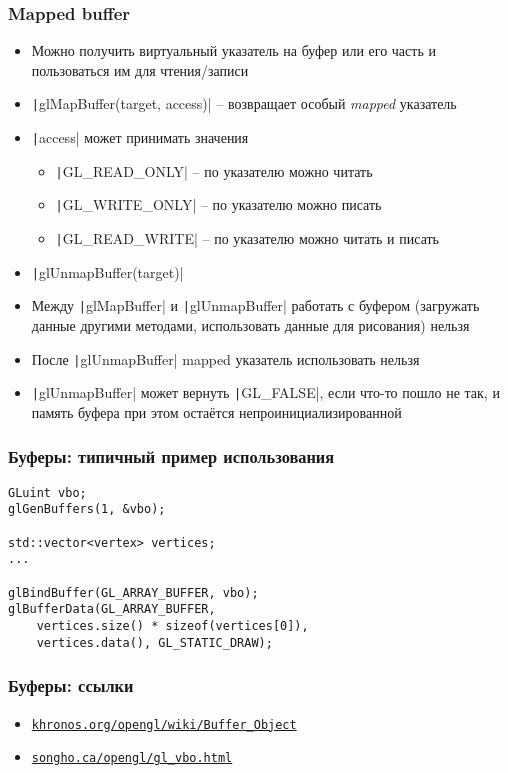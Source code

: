 \documentclass[10pt]{beamer}
\begin{document}
\begin{frame}[fragile]
\frametitle{Mapped buffer}
\begin{itemize}
\item Можно получить виртуальный указатель на буфер или его часть и пользоваться им для чтения/записи
\pause
\item \texttt|glMapBuffer(target, access)| -- возвращает особый \textit{mapped} указатель
\item \texttt|access| может принимать значения
\begin{itemize}
\item \texttt|GL_READ_ONLY| -- по указателю можно читать
\item \texttt|GL_WRITE_ONLY| -- по указателю можно писать
\item \texttt|GL_READ_WRITE| -- по указателю можно читать и писать
\end{itemize}
\pause
\item \texttt|glUnmapBuffer(target)|
\pause
\item Между \texttt|glMapBuffer| и \texttt|glUnmapBuffer| работать с буфером (загружать данные другими методами, использовать данные для рисования) нельзя
\pause
\item После \texttt|glUnmapBuffer| mapped указатель использовать нельзя
\pause
\item \texttt|glUnmapBuffer| может вернуть \texttt|GL_FALSE|, если что-то пошло не так, и память буфера при этом остаётся непроинициализированной
\end{itemize}
\end{frame}

\begin{frame}[fragile]
\frametitle{Буферы: типичный пример использования}
\begin{verbatim}
GLuint vbo;
glGenBuffers(1, &vbo);

std::vector<vertex> vertices;
...

glBindBuffer(GL_ARRAY_BUFFER, vbo);
glBufferData(GL_ARRAY_BUFFER,
    vertices.size() * sizeof(vertices[0]),
    vertices.data(), GL_STATIC_DRAW);
\end{verbatim}
\end{frame}

\begin{frame}[fragile]
\frametitle{Буферы: ссылки}
\begin{itemize}
\item \href{https://www.khronos.org/opengl/wiki/Buffer_Object}{\nolinkurl{khronos.org/opengl/wiki/Buffer\_Object}}
\item \href{https://www.songho.ca/opengl/gl_vbo.html}{\nolinkurl{songho.ca/opengl/gl\_vbo.html}}
\end{itemize}
\end{frame}
\end{document}
